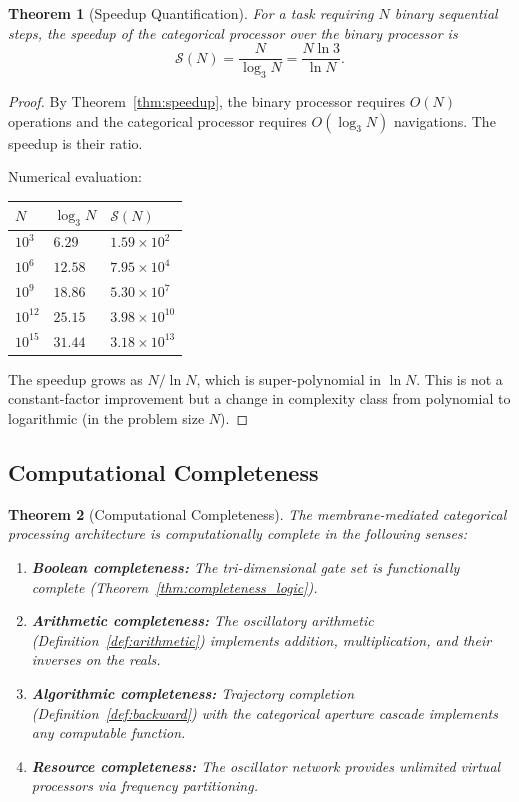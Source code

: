 \documentclass[twocolumn,10pt]{article}
\newtheorem{theorem}{Theorem}[section]
\theoremstyle{remark}
\begin{document}
\begin{theorem}[Speedup Quantification]
\label{thm:speedup_quant}
For a task requiring $N$ binary sequential steps, the speedup of the categorical processor over the binary processor is
\begin{equation}
\mathcal{S}(N) = \frac{N}{\log_3 N} = \frac{N \ln 3}{\ln N}.
\label{eq:speedup_quant}
\end{equation}
\end{theorem}

\begin{proof}
By Theorem~\ref{thm:speedup}, the binary processor requires $O(N)$ operations and the categorical processor requires $O(\log_3 N)$ navigations. The speedup is their ratio.

Numerical evaluation:
\begin{center}
\begin{tabular}{@{}lll@{}}
\toprule
$N$ & $\log_3 N$ & $\mathcal{S}(N)$ \\
\midrule
$10^3$ & $6.29$ & $1.59 \times 10^2$ \\
$10^6$ & $12.58$ & $7.95 \times 10^4$ \\
$10^9$ & $18.86$ & $5.30 \times 10^7$ \\
$10^{12}$ & $25.15$ & $3.98 \times 10^{10}$ \\
$10^{15}$ & $31.44$ & $3.18 \times 10^{13}$ \\
\bottomrule
\end{tabular}
\end{center}

The speedup grows as $N / \ln N$, which is super-polynomial in $\ln N$. This is not a constant-factor improvement but a change in complexity class from polynomial to logarithmic (in the problem size $N$).
\end{proof}

\subsection{Computational Completeness}

\begin{theorem}[Computational Completeness]
\label{thm:complete}
The membrane-mediated categorical processing architecture is computationally complete in the following senses:
\begin{enumerate}
\item \textbf{Boolean completeness:} The tri-dimensional gate set is functionally complete (Theorem~\ref{thm:completeness_logic}).
\item \textbf{Arithmetic completeness:} The oscillatory arithmetic (Definition~\ref{def:arithmetic}) implements addition, multiplication, and their inverses on the reals.
\item \textbf{Algorithmic completeness:} Trajectory completion (Definition~\ref{def:backward}) with the categorical aperture cascade implements any computable function.
\item \textbf{Resource completeness:} The oscillator network provides unlimited virtual processors via frequency partitioning.
\end{enumerate}
\end{theorem}
\end{document}

